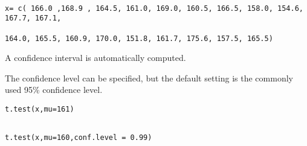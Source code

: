 

 




\begin{framed}
\begin{verbatim}

x= c( 166.0 ,168.9 , 164.5, 161.0, 169.0, 160.5, 166.5, 158.0, 154.6, 167.7, 167.1,

164.0, 165.5, 160.9, 170.0, 151.8, 161.7, 175.6, 157.5, 165.5)
\end{verbatim}
\end{framed}

 
A confidence interval is automatically computed.

The confidence level can be specified, but the default setting is the commonly used 95\% confidence level.

\begin{framed}
\begin{verbatim}
t.test(x,mu=161)
\end{verbatim}
\end{framed}
\begin{framed}
\begin{verbatim}

t.test(x,mu=160,conf.level = 0.99)
\end{verbatim}
\end{framed} 


